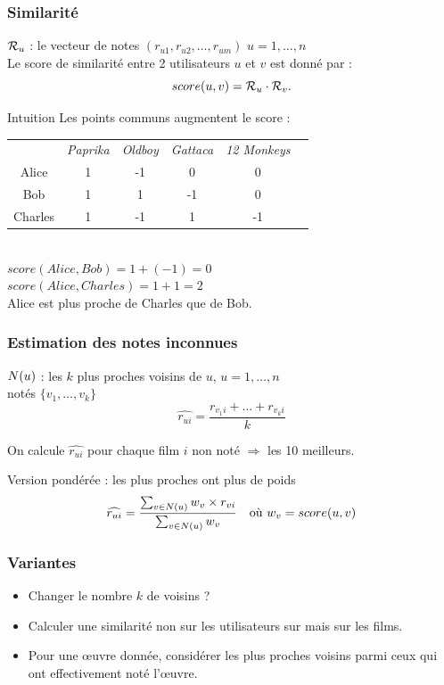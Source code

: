 \documentclass[handout]{beamer}
\begin{document}
\begin{frame}
	\frametitle{Similarité}
	$\mathcal{R}_u$ : le vecteur de notes $(r_{u1}, r_{u2}, \ldots, r_{um})$ \qquad $u = 1, \ldots, n$\\
	Le \alert{score de similarité} entre 2 utilisateurs $u$ et $v$ est donné par :
	\[ score(u, v) = \mathcal{R}_u \cdot \mathcal{R}_v. \]
	\begin{exampleblock}{Intuition}
	Les points communs augmentent le score :
	\begin{center}
	\begin{tabular}{cccccc}
	& \emph{Paprika} & \emph{Oldboy} & \emph{Gattaca} & \emph{12 Monkeys}\\
	Alice & 1 & -1 & 0 & 0\\
	Bob & 1 & 1 & -1 & 0\\
	Charles & 1 & -1 & 1 & -1
	\end{tabular}\\
	\vspace{5mm}
	$score(Alice, Bob) = 1 + (-1) = 0$\\
	$score(Alice, Charles) = 1 + 1 = 2$\\
	Alice est \alert{plus proche} de Charles que de Bob.
	\end{center}
	\end{exampleblock}
\end{frame}

\begin{frame}
	\frametitle{Estimation des notes inconnues}
	$N(u)$ : les $k$ plus proches voisins de $u$, \qquad $u = 1, \ldots, n$\\
	notés $\{v_1, \ldots, v_k\}$\bigskip
	\pause
	\[ \widehat{r_{ui}} = \frac{r_{v_1 i} + \ldots + r_{v_k i}}k \] %
	\pause
	
	On calcule $\widehat{r_{ui}}$ pour chaque film $i$ non noté $\Rightarrow$ les \alert{10 meilleurs}.\bigskip
	
	\pause
	Version \alert{pondérée} : les plus proches ont plus de poids
	\[ \widehat{r_{ui}} = \frac{\sum_{v \in N(u)} w_v \times r_{vi}}{\sum_{v \in N(u)} w_v} \quad \textnormal{où } w_v = score(u, v) \]
\end{frame}

\begin{frame}
	\frametitle{Variantes}
	\begin{itemize}
	\item Changer le nombre $k$ de voisins ?
	\item Calculer une similarité non sur les utilisateurs sur mais sur les films.
	\item Pour une œuvre donnée, considérer les plus proches voisins parmi ceux qui ont effectivement noté l'œuvre.
	\end{itemize}
\end{frame}
\end{document}
